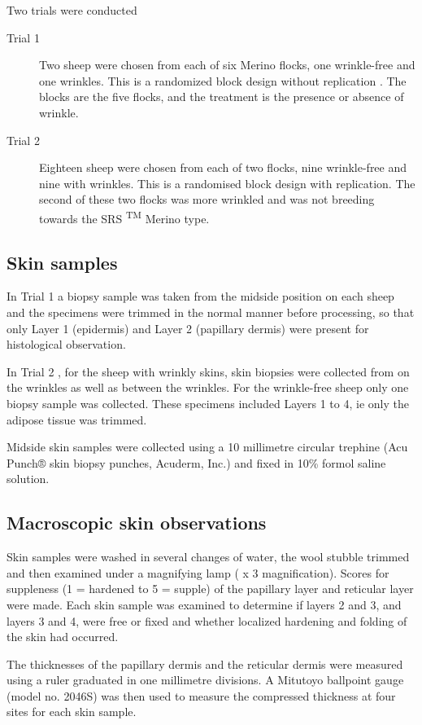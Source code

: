 \documentclass[titlepage]{article}  %
\begin{document}
Two trials were conducted
\begin{description}
\item[Trial 1]  Two sheep were chosen from each of six Merino flocks, one wrinkle-free and one wrinkles. This is a randomized block design without replication .  The blocks are the five flocks, and the treatment is the presence or absence of wrinkle.
\item[Trial 2]  Eighteen sheep were chosen from each of two flocks, nine wrinkle-free and nine with wrinkles. This is a randomised block design with replication. The second of these two flocks was more wrinkled and was not breeding towards the SRS \textsuperscript{TM} Merino type.
\end{description} 
\subsection{Skin samples}
In Trial 1 a biopsy sample was taken from the midside position on each sheep and the specimens were trimmed in the normal manner before processing, so that only Layer 1 (epidermis) and Layer 2 (papillary dermis) were present for histological observation.

In Trial 2 , for the sheep with wrinkly skins, skin biopsies were collected from on the wrinkles as well as between the wrinkles. For the wrinkle-free sheep only one biopsy sample was collected. These specimens included Layers 1 to 4, ie only the adipose tissue was trimmed.

Midside skin samples were collected using a 10 millimetre
circular trephine (Acu Punch® skin biopsy punches, Acuderm, Inc.) and
fixed in 10\% formol saline solution. 

\subsection{Macroscopic skin observations}

Skin samples were washed in several changes of water, the wool
stubble trimmed and then examined under a magnifying lamp ( x 3
magnification).  Scores for  suppleness (1 = hardened to 5 = supple)
of the papillary layer and reticular layer  were made.  Each skin
sample was examined to determine if layers 2 and 3, and layers 3 and 4,
were free or fixed and whether localized hardening and folding of the
skin had occurred.

The thicknesses of the papillary dermis and
the reticular dermis were measured using a ruler graduated in one
millimetre divisions. A Mitutoyo ballpoint gauge
(model no. 2046S) was then used to measure the compressed thickness at
four sites for each skin sample.
\end{document}
